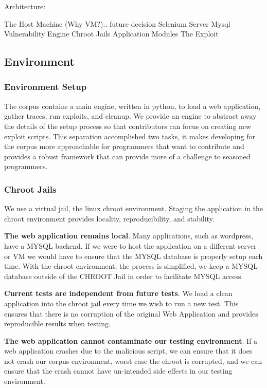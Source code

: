 \documentclass[letterpaper,twocolumn,10pt]{article}
\begin{document}
Architecture:

  The Host Machine
    (Why VM?).. future decision
    Selenium Server
    Mysql
  Vulnerability Engine
    Chroot Jails
    Application Modules
    The Exploit


\subsection{Environment}


\subsubsection{Environment Setup}

The corpus contains a main engine, written in python, to load a web application, gather traces, run exploits, and cleanup.  We provide an engine to abstract away the details of the setup process so that contributors can focus on creating new exploit scripts.  This separation accomplished two tasks, it makes developing for the corpus more approachable for programmers that want to contribute and provides a robust framework that can provide more of a challenge to seasoned programmers.

\subsubsection{Chroot Jails}


We use a virtual jail, the linux chroot environment.  Staging the application in the chroot environment provides locality, reproducibility, and stability.  

{\bf The web application remains local}.  Many applications, such as wordpress, have a MYSQL backend.  If we were to host the application on a different server or VM we would have to ensure that the MYSQL database is properly setup each time.  With the chroot environment, the process is simplified, we keep a MYSQL database outside of the CHROOT Jail in order to facilitate MYSQL access.  

{\bf Current tests are independent from future tests}.  We load a clean application into the chroot jail every time we wish to run a new test.  This ensures that there is no corruption of the original Web Application and provides reproducible results when testing.

{\bf The web application cannot contaminate our testing environment}.  If a web application crashes due to the malicious script, we can ensure that it does not crash our corpus environment, worst case the chroot is corrupted, and we can ensure that the crash cannot have un-intended side effects in our testing environment.  
\end{document}
